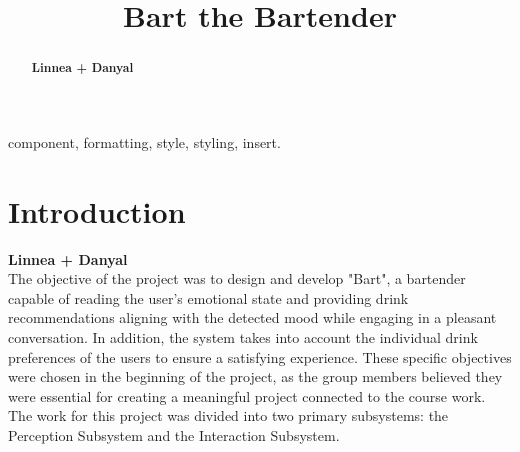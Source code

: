 \documentclass[conference]{IEEEtran}
\begin{document}
\title{Bart the Bartender\\
}

\author{
\and
{}

\and
{}
\and
{}

}

\maketitle


\begin{abstract}
\textbf{Linnea + Danyal}
\end{abstract}

\begin{IEEEkeywords}
component, formatting, style, styling, insert.
\end{IEEEkeywords}

\section{Introduction}
\textbf{Linnea + Danyal}\\
The objective of the project was to design and develop "Bart", a bartender capable of reading the user's emotional state and providing drink recommendations aligning with the detected mood while engaging in a pleasant conversation. In addition, the system takes into account the individual drink preferences of the users to ensure a satisfying experience. These specific objectives were chosen in the beginning of the project, as the group members believed they were essential for creating a meaningful project connected to the course work. 
The work for this project was divided into two primary subsystems: the Perception Subsystem and the Interaction Subsystem. 
\end{document}
